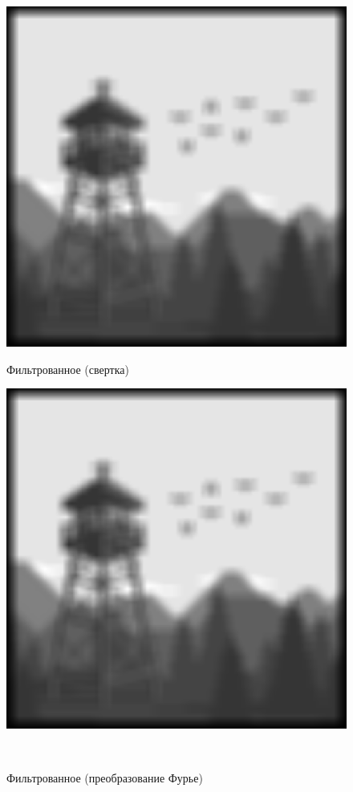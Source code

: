 \documentclass[a4paper]{article}
\begin{document}
\begin{figure}[H]
    \begin{minipage}{0.49\textwidth}
        \centering \includegraphics[width=\textwidth]{2/19_img_block_by_conv2.png}
        \caption{Фильтрованное (свертка)}
    \end{minipage}\hfill
    \begin{minipage}{0.49\textwidth}
        \centering \includegraphics[width=\textwidth]{2/19_img_block_by_fourier.png}
        \caption{Фильтрованное (преобразование Фурье)}
    \end{minipage}\\[1em]
\end{figure}\noindent\
\end{document}
